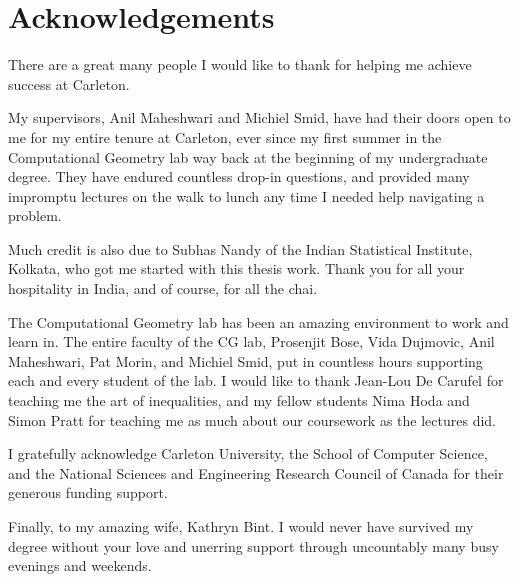 \chapter*{Acknowledgements}

There are a great many people I would like to thank for helping me achieve success at Carleton.

My supervisors, Anil Maheshwari and Michiel Smid, have had their doors open to me for my entire tenure at Carleton, ever since my first summer in the Computational Geometry lab way back at the beginning of my undergraduate degree. 
They have endured countless drop-in questions, and provided many impromptu lectures on the walk to lunch any time I needed help navigating a problem.

Much credit is also due to Subhas Nandy of the Indian Statistical Institute, Kolkata, who got me started with this thesis work. 
Thank you for all your hospitality in India, and of course, for all the chai.

The Computational Geometry lab has been an amazing environment to work and learn in. 
The entire faculty of the CG lab, Prosenjit Bose, Vida Dujmovic, Anil Maheshwari, Pat Morin, and Michiel Smid, put in countless hours supporting each and every student of the lab. 
I would like to thank Jean-Lou De Carufel for teaching me the art of inequalities, and my fellow students Nima Hoda and Simon Pratt for teaching me as much about our coursework as the lectures did.

I gratefully acknowledge Carleton University, the School of Computer Science, and the National Sciences and Engineering Research Council of Canada for their generous funding support.

Finally, to my amazing wife, Kathryn Bint. 
I would never have survived my degree without your love and unerring support through uncountably many busy evenings and weekends.
